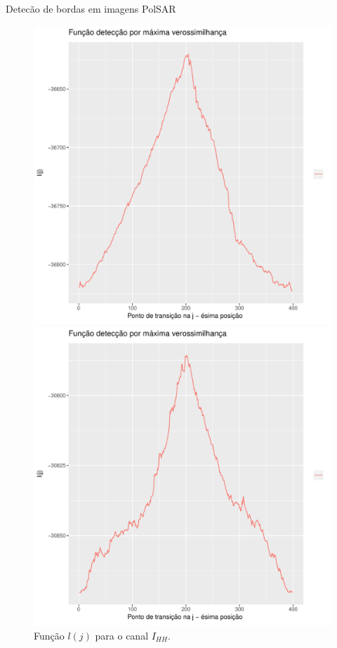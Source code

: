 \documentclass[10pt]{beamer}
\begin{document}
\begin{frame}{Detecão de bordas em imagens PolSAR}
  \begin{figure}[hbt]
  \includegraphics[width=\linewidth]{grafico_l_nhfc_2014_sigmahh.pdf}
	\caption{Função $l(j)$ para o canal $I_{HH}$.}\label{cap_acf_fig04}
\endminipage\hfill
{}
  \includegraphics[width=\linewidth]{grafico_l_nhfc_2014_sigmahv.pdf}

\end{figure}
\end{frame}
\end{document}
